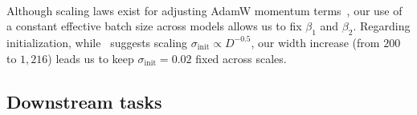 \documentclass{article}
\begin{document}
\\
Although scaling laws exist for adjusting AdamW momentum terms~\citep{malladi2022sdes}, our use of a constant effective batch size across models allows us to fix $\beta_1$ and $\beta_2$. Regarding initialization, while~\citet{hagele2024scaling} suggests scaling $\sigma_{\text{init}} \propto D^{-0.5}$, our width increase (from $200$ to $1,216$) leads us to keep $\sigma_{\text{init}} = 0.02$ fixed across scales.

\subsection{Downstream tasks}

\end{document}
